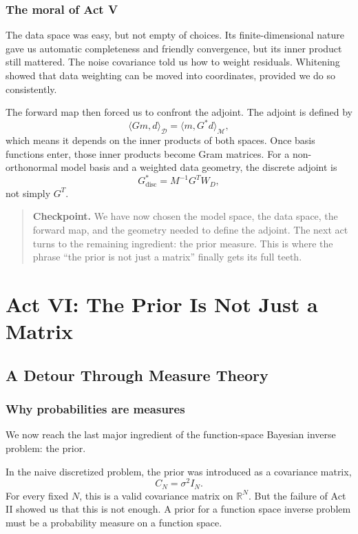 \documentclass[11pt,a4paper]{book}
\newenvironment{checkpoint}
  {\begin{quote}\textbf{Checkpoint.}}
  {\end{quote}}
\newcommand{\M}{\mathcal{M}}      %
\newcommand{\D}{\mathcal{D}}      %
\newcommand{\R}{\mathbb{R}}
\newcommand{\G}{G}
\newcommand{\Gadj}{G^\ast}
\begin{document}
\section{The moral of Act V}

The data space was easy, but not empty of choices. Its finite-dimensional nature
gave us automatic completeness and friendly convergence, but its inner product
still mattered. The noise covariance told us how to weight residuals. Whitening
showed that data weighting can be moved into coordinates, provided we do so
consistently.

The forward map then forced us to confront the adjoint. The adjoint is defined
by
\[
    \langle \G m,d\rangle_{\D}
    =
    \langle m,\Gadj d\rangle_{\M},
\]
which means it depends on the inner products of both spaces. Once basis
functions enter, those inner products become Gram matrices. For a
non-orthonormal model basis and a weighted data geometry, the discrete adjoint
is
\[
    G^\ast_{\mathrm{disc}}
    =
    M^{-1}G^T W_D,
\]
not simply $G^T$.

\begin{checkpoint}
We have now chosen the model space, the data space, the forward map, and the
geometry needed to define the adjoint. The next act turns to the remaining
ingredient: the prior measure. This is where the phrase ``the prior is not just
a matrix'' finally gets its full teeth.
\end{checkpoint}

\part{Act VI: The Prior Is Not Just a Matrix}

\chapter{A Detour Through Measure Theory}

\section{Why probabilities are measures}

We now reach the last major ingredient of the function-space Bayesian inverse
problem: the prior.

In the naive discretized problem, the prior was introduced as a covariance
matrix,
\[
    C_N = \sigma^2 I_N.
\]
For every fixed $N$, this is a valid covariance matrix on $\R^N$. But the
failure of Act II showed us that this is not enough. A prior for a function
space inverse problem must be a probability measure on a function space.
\end{document}
